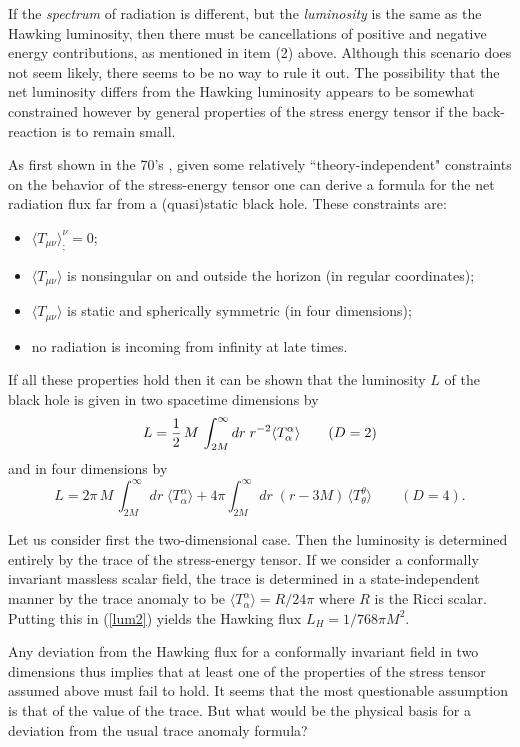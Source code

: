 \documentclass[12pt]{article}
\def\la{\langle}
\def\ra{\rangle}
\begin{document}
If the {\it spectrum} of radiation is different, but the {\it luminosity}
is the same as the Hawking luminosity, then there must be cancellations
of positive and negative energy contributions, as mentioned in item
(2) above. Although this scenario does not seem likely, there seems
to be no way to rule it out. The possibility that the net luminosity
differs from the Hawking luminosity appears to be somewhat constrained
however by general properties of the stress energy tensor if the
back-reaction is to remain small.

As first shown in the 70's \cite{DavFullUn,ChristFull},
given some relatively ``theory-independent" constraints on
the behavior of the stress-energy tensor one can derive
a formula for the net radiation flux far from a (quasi)static black hole.
These constraints are:
\begin{itemize}
\item $\la T_{\mu\nu}\ra_{;}^{\nu}=0$;
\item $\la T_{\mu\nu}\ra$ is nonsingular on and outside
the horizon (in regular coordinates);
\item $\la T_{\mu\nu}\ra$ is static and spherically
symmetric (in four dimensions);
\item no radiation is incoming from infinity at late
times.
\end{itemize}
If all these properties hold then it can be shown\cite{ChristFull}
that the luminosity $L$ of the black hole is given in
two spacetime dimensions by
\begin{equation}
L={1\over2}\, M\, \int_{2M}^\infty dr\;
r^{-2} \la T_\alpha^\alpha\ra\qquad(D=2)
\label{lum2}
\end{equation}
and in four dimensions by
\begin{equation}
L=2\pi\, M\, \int_{2M}^\infty dr\; \la T_\alpha^\alpha\ra
+4\pi\int_{2M}^\infty dr\; (r-3M)\,
\la T_\theta^\theta\ra\qquad(D=4).
\label{L}
\end{equation}

Let us consider first the two-dimensional case. Then the
luminosity is determined entirely by the trace of the
stress-energy tensor. If we consider a conformally invariant
massless scalar field, the trace is determined in a
state-independent manner by the trace anomaly to be
$\la T_\alpha^\alpha\ra =R/24\pi$ where $R$ is the Ricci
scalar. Putting this in (\ref{lum2}) yields the Hawking
flux $L_H=1/768\pi M^2$.

Any deviation from the Hawking flux
for a conformally invariant field in two dimensions thus implies
that at least one of the properties of the stress tensor assumed
above must fail to hold. It seems that the most questionable assumption
is that of the value of the trace. But what would be the physical
basis for a deviation from the usual trace anomaly formula?
\end{document}
